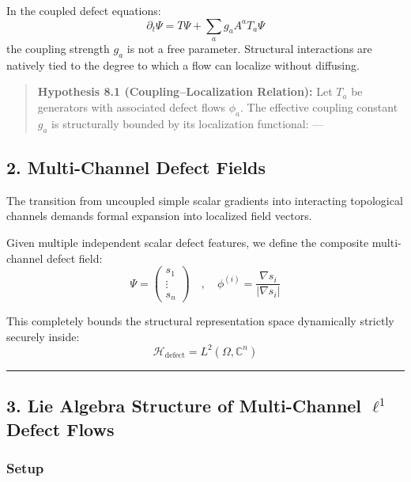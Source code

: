 \documentclass[
]{article}
\begin{document}
In the coupled defect equations:
\[ \partial_t \Psi = T \Psi + \sum_a g_a A^a T_a \Psi \] the coupling
strength \(g_a\) is not a free parameter. Structural interactions are
natively tied to the degree to which a flow can localize without
diffusing.

\begin{quote}
\textbf{Hypothesis 8.1 (Coupling--Localization Relation):} Let \(T_a\)
be generators with associated defect flows \(\phi_a\). The effective
coupling constant \(g_a\) is structurally bounded by its localization
functional: ---
\end{quote}

\subsection{2. Multi-Channel Defect
Fields}\label{multi-channel-defect-fields-1}

The transition from uncoupled simple scalar gradients into interacting
topological channels demands formal expansion into localized field
vectors.

Given multiple independent scalar defect features, we define the
composite multi-channel defect field:
\[ \Psi = \begin{pmatrix} s_1 \\ \vdots \\ s_n \end{pmatrix} \quad,\quad \phi^{(i)} = \frac{\nabla s_i}{|\nabla s_i|} \]

This completely bounds the structural representation space dynamically
strictly securely inside:
\[ \mathcal{H}_{\text{defect}} = L^2(\Omega, \mathbb{C}^n) \]

\begin{center}\rule{0.5\linewidth}{0.5pt}\end{center}

\subsection{\texorpdfstring{3. Lie Algebra Structure of Multi-Channel
\(\ell^1\) Defect
Flows}{3. Lie Algebra Structure of Multi-Channel \textbackslash ell\^{}1 Defect Flows}}\label{lie-algebra-structure-of-multi-channel-ell1-defect-flows-1}

\subsubsection{Setup}\label{setup-3}
\end{document}
